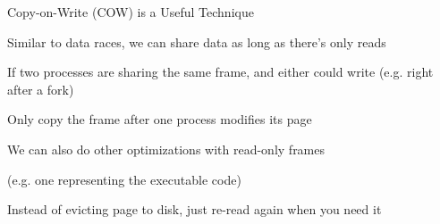   \begin{frame}{Copy-on-Write (COW) is a Useful Technique}

    Similar to data races, we can share data as long as there's only reads

    \vspace{2em}

    If two processes are sharing the same frame, and either could write (e.g.
    right after a fork)

    \hspace{2em} Only copy the frame after one process modifies its page

    \vspace{2em}

    We can also do other optimizations with read-only frames
    
    (e.g. one representing the executable code)

    \hspace{2em} Instead of evicting page to disk, just re-read again when you
                 need it
  \end{frame}

